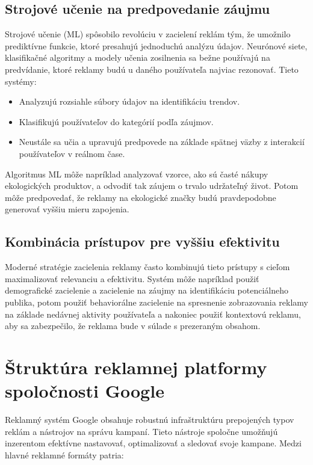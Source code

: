 \documentclass[10pt,slovak,a4paper]{article}
\begin{document}
\subsection{Strojové učenie na predpovedanie záujmu}
Strojové učenie (ML) spôsobilo revolúciu v zacielení reklám tým, že umožnilo prediktívne funkcie, ktoré presahujú jednoduchú analýzu údajov. Neurónové siete, klasifikačné algoritmy a modely učenia zosilnenia sa bežne používajú na predvídanie, ktoré reklamy budú u daného používateľa najviac rezonovať. Tieto systémy:
\begin{itemize}
    \item Analyzujú rozsiahle súbory údajov na identifikáciu trendov.
    \item Klasifikujú používateľov do kategórií podľa záujmov.
    \item Neustále sa učia a upravujú predpovede na základe spätnej väzby z interakcií používateľov v reálnom čase.
\end{itemize}
Algoritmus ML môže napríklad analyzovať vzorce, ako sú časté nákupy ekologických produktov, a odvodiť tak záujem o trvalo udržateľný život. Potom môže predpovedať, že reklamy na ekologické značky budú pravdepodobne generovať vyššiu mieru zapojenia.

\subsection{Kombinácia prístupov pre vyššiu efektivitu}
Moderné stratégie zacielenia reklamy často kombinujú tieto prístupy s cieľom maximalizovať relevanciu a efektivitu. Systém môže napríklad použiť demografické zacielenie a zacielenie na záujmy na identifikáciu potenciálneho publika, potom použiť behaviorálne zacielenie na spresnenie zobrazovania reklamy na základe nedávnej aktivity používateľa a nakoniec použiť kontextovú reklamu, aby sa zabezpečilo, že reklama bude v súlade s prezeraným obsahom.


\section{Štruktúra reklamnej platformy spoločnosti Google}
Reklamný systém Google obsahuje robustnú infraštruktúru prepojených typov reklám a nástrojov na správu kampaní. 
Tieto nástroje spoločne umožňujú inzerentom efektívne nastavovať, optimalizovať a sledovať svoje kampane. 
Medzi hlavné reklamné formáty patria:\cite{9163447}\cite{6480027}
\end{document}
